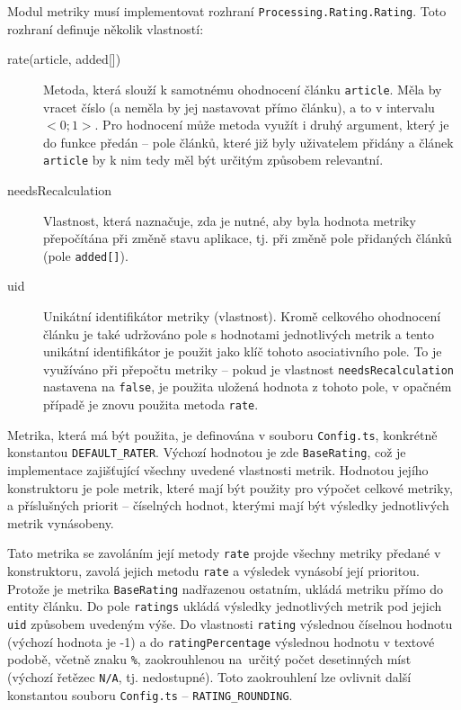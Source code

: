 Modul metriky musí implementovat rozhraní \texttt{Pro\-cess\-ing.\-Ra\-ting.\-Ra\-ting}. Toto rozhraní definuje několik vlastností:
\begin{description}
	\item[rate(article, added{[}{]})] Metoda, která slouží k samotnému ohodnocení článku \texttt{article}. Měla by vracet číslo (a neměla by jej nastavovat přímo článku), a to v intervalu $<0; 1>$. Pro hodnocení může metoda využít i druhý argument, který je do funkce předán -- pole článků, které již byly uživatelem přidány a článek \texttt{article} by k nim tedy měl být určitým způsobem relevantní.
	\item[needsRecalculation] Vlastnost, která naznačuje, zda je nutné, aby byla hodnota metriky přepočítána při změně stavu aplikace, tj. při změně pole přidaných článků (pole \texttt{added[]}).
	\item[uid] Unikátní identifikátor metriky (vlastnost). Kromě celkového ohodnocení článku je také udržováno pole s hodnotami jednotlivých metrik a tento unikátní identifikátor je použit jako klíč tohoto asociativního pole. To je využíváno při přepočtu metriky -- pokud je vlastnost \texttt{needsRecalculation} nastavena na \texttt{false}, je použita uložená hodnota z tohoto pole, v opačném případě je znovu použita metoda \texttt{rate}.
\end{description}

Metrika, která má být použita, je definována v souboru \texttt{Config.ts}, konkrétně konstantou \texttt{DEFAULT\_RATER}. Výchozí hodnotou je zde \texttt{BaseRating}, což je implementace zajišťující všechny uvedené vlastnosti metrik. Hodnotou jejího konstruktoru je pole metrik, které mají být použity pro výpočet celkové metriky, a příslušných priorit -- číselných hodnot, kterými mají být výsledky jednotlivých metrik vynásobeny.

Tato metrika se zavoláním její metody \texttt{rate} projde všechny metriky předané v konstruktoru, zavolá jejich metodu \texttt{rate} a výsledek vynásobí její prioritou. Protože je metrika \texttt{BaseRating} nadřazenou ostatním, ukládá metriku přímo do entity článku. Do pole \texttt{ratings} ukládá výsledky jednotlivých metrik pod jejich \texttt{uid} způsobem uvedeným výše. Do vlastnosti \texttt{rating} výslednou číselnou hodnotu (výchozí hodnota je -1) a do \texttt{ra\-t\-ing\-Per\-cent\-age} výslednou hodnotu v textové podobě, včetně znaku \texttt{\%}, zaokrouhlenou na~určitý počet desetinných míst (výchozí řetězec \texttt{N/A}, tj. nedostupné). Toto zaokrouhlení lze ovlivnit další konstantou souboru \texttt{Config.ts} -- \texttt{RATING\_ROUNDING}.

